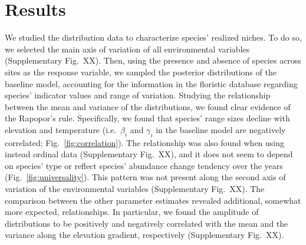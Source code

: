 \documentclass[11pt, a4paper]{article}
\begin{document}
\section*{Results}
We studied the distribution data to characterize species' realized niches. To do so, we selected the main axis of variation of all environmental variables (Supplementary Fig.~XX). Then, using the presence and absence of species across sites as the response variable, we sampled the posterior distributions of the baseline model, accounting for the information in the floristic database regarding species' indicator values and range of variation. Studying the relationship between the mean and variance of the distributions, we found clear evidence of the Rapopor's rule. Specifically, we found that species' range sizes decline with elevation and temperature (i.e.~$\beta_{i}$ and $\gamma_{i}$ in the baseline model are negatively correlated; Fig.~\ref{fig:correlation}). The relationship was also found when using instead ordinal data (Supplementary Fig.~XX), and it does not seem to depend on species' type or reflect species' abundance change tendency over the years (Fig.~\ref{fig:universality}). This pattern was not present along the second axis of variation of the environmental variables (Supplementary Fig.~XX). The comparison between the other parameter estimates revealed additional, somewhat more expected, relationships. In particular, we found the amplitude of distributions to be positively and negatively correlated with the mean and the variance along the elevation gradient, respectively (Supplementary Fig.~XX).
\end{document}

